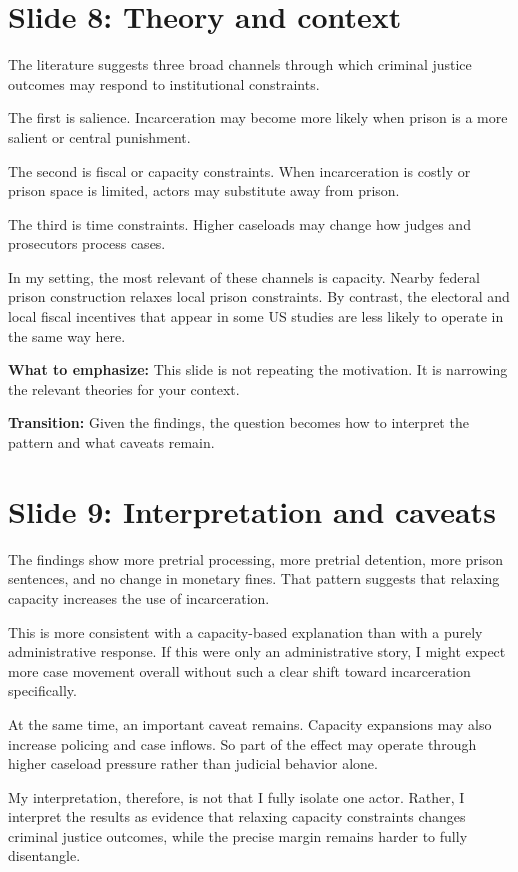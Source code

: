 \documentclass[11pt]{article}
\begin{document}
\section{Slide 8: Theory and context}
The literature suggests three broad channels through which criminal justice outcomes may respond to institutional constraints.

The first is salience. Incarceration may become more likely when prison is a more salient or central punishment.

The second is fiscal or capacity constraints. When incarceration is costly or prison space is limited, actors may substitute away from prison.

The third is time constraints. Higher caseloads may change how judges and prosecutors process cases.

In my setting, the most relevant of these channels is capacity. Nearby federal prison construction relaxes local prison constraints. By contrast, the electoral and local fiscal incentives that appear in some US studies are less likely to operate in the same way here.

\textbf{What to emphasize:}
This slide is not repeating the motivation. It is narrowing the relevant theories for your context.

\textbf{Transition:} Given the findings, the question becomes how to interpret the pattern and what caveats remain.

\section{Slide 9: Interpretation and caveats}
The findings show more pretrial processing, more pretrial detention, more prison sentences, and no change in monetary fines. That pattern suggests that relaxing capacity increases the use of incarceration.

This is more consistent with a capacity-based explanation than with a purely administrative response. If this were only an administrative story, I might expect more case movement overall without such a clear shift toward incarceration specifically.

At the same time, an important caveat remains. Capacity expansions may also increase policing and case inflows. So part of the effect may operate through higher caseload pressure rather than judicial behavior alone.

My interpretation, therefore, is not that I fully isolate one actor. Rather, I interpret the results as evidence that relaxing capacity constraints changes criminal justice outcomes, while the precise margin remains harder to fully disentangle.
\end{document}

